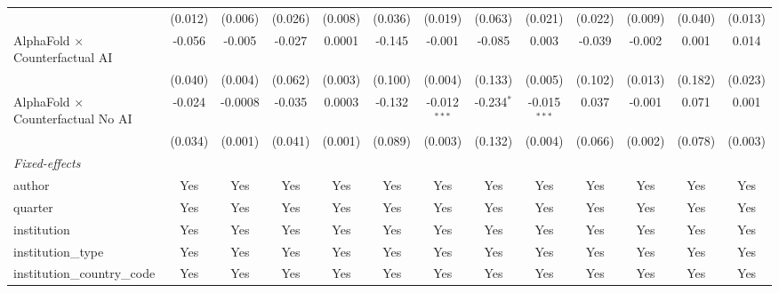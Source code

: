\begin{tabular}{lcccccccccccc}
                                            & (0.012)       & (0.006)       & (0.026)     & (0.008) & (0.036)     & (0.019)        & (0.063)      & (0.021)        & (0.022)      & (0.009)      & (0.040)     & (0.013)\\   
   AlphaFold $\times$ Counterfactual AI     & -0.056        & -0.005        & -0.027      & 0.0001  & -0.145      & -0.001         & -0.085       & 0.003          & -0.039       & -0.002       & 0.001       & 0.014\\   
                                            & (0.040)       & (0.004)       & (0.062)     & (0.003) & (0.100)     & (0.004)        & (0.133)      & (0.005)        & (0.102)      & (0.013)      & (0.182)     & (0.023)\\   
   AlphaFold $\times$ Counterfactual No AI  & -0.024        & -0.0008       & -0.035      & 0.0003  & -0.132      & -0.012$^{***}$ & -0.234$^{*}$ & -0.015$^{***}$ & 0.037        & -0.001       & 0.071       & 0.001\\   
                                            & (0.034)       & (0.001)       & (0.041)     & (0.001) & (0.089)     & (0.003)        & (0.132)      & (0.004)        & (0.066)      & (0.002)      & (0.078)     & (0.003)\\   
   \midrule
   \emph{Fixed-effects}\\
   author                                   & Yes           & Yes           & Yes         & Yes     & Yes         & Yes            & Yes          & Yes            & Yes          & Yes          & Yes         & Yes\\  
   quarter                                  & Yes           & Yes           & Yes         & Yes     & Yes         & Yes            & Yes          & Yes            & Yes          & Yes          & Yes         & Yes\\  
   institution                              & Yes           & Yes           & Yes         & Yes     & Yes         & Yes            & Yes          & Yes            & Yes          & Yes          & Yes         & Yes\\  
   institution\_type                        & Yes           & Yes           & Yes         & Yes     & Yes         & Yes            & Yes          & Yes            & Yes          & Yes          & Yes         & Yes\\  
   institution\_country\_code               & Yes           & Yes           & Yes         & Yes     & Yes         & Yes            & Yes          & Yes            & Yes          & Yes          & Yes         & Yes\\  

\end{tabular}
